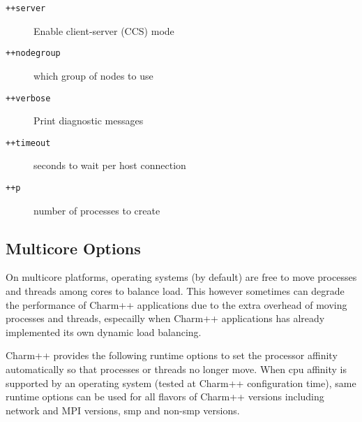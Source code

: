 \begin{description}
\item[{\tt ++server}]           Enable client-server (CCS) mode

\item[{\tt ++nodegroup}]        which group of nodes to use

\item[{\tt ++verbose}]          Print diagnostic messages

\item[{\tt ++timeout}]          seconds to wait per host connection

\item[{\tt ++p}]                number of processes to create

\end{description}

\subsection{Multicore Options}

On multicore platforms, operating systems (by default) are free to move
processes and threads among cores to balance load. This however sometimes can
degrade the performance of Charm++ applications due to the extra overhead of
moving processes and threads, especailly when Charm++ applications has already
implemented its own dynamic load balancing.

Charm++ provides the following runtime options to set the processor affinity
automatically so that processes or threads no longer move. When cpu affinity
is supported by an operating system (tested at Charm++ configuration time),
same runtime options can be used for all flavors of Charm++ versions including
network and MPI versions, smp and non-smp versions.

